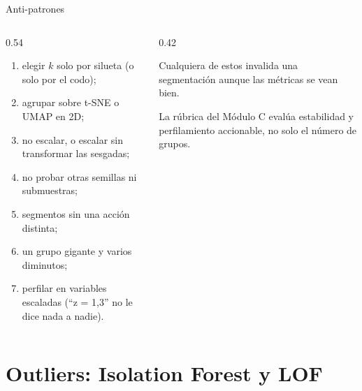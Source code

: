 \documentclass[aspectratio=169,12pt]{beamer}
\begin{document}
\begin{frame}{Anti-patrones}
  \begin{columns}[T]
    \begin{column}{0.54\textwidth}
      \small
      \begin{enumerate}
        \item elegir $k$ solo por silueta (o solo por el codo);
        \item agrupar sobre t-SNE o UMAP en 2D;
        \item no escalar, o escalar sin transformar las sesgadas;
        \item no probar otras semillas ni submuestras;
        \item segmentos sin una acción distinta;
        \item un grupo gigante y varios diminutos;
        \item perfilar en variables escaladas (``z = 1,3'' no le dice nada a nadie).
      \end{enumerate}
    \end{column}
    \begin{column}{0.42\textwidth}
      \begin{rulebox}
        \small Cualquiera de estos invalida una segmentación aunque las métricas se vean bien.
      \end{rulebox}
      \begin{keybox}[Taller]
        \small La rúbrica del Módulo C evalúa estabilidad y perfilamiento accionable, no solo el número de grupos.
      \end{keybox}
    \end{column}
  \end{columns}
\end{frame}

\section{Outliers: Isolation Forest y LOF}
\end{document}
